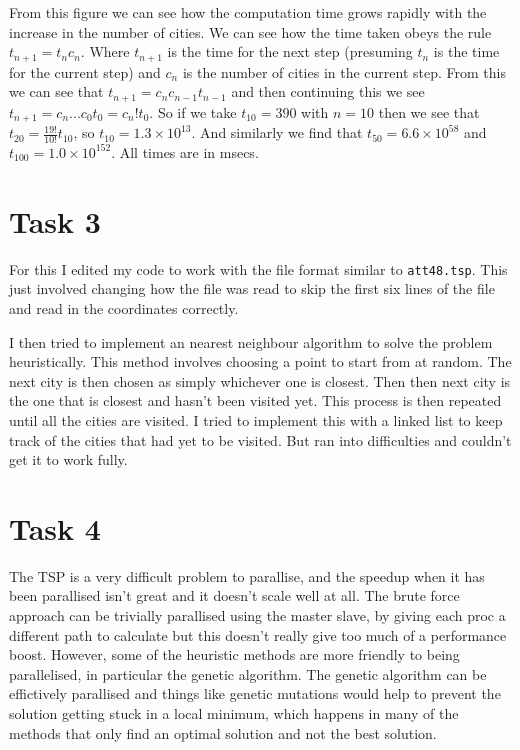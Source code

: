 \documentclass{article}
\begin{document}
From this figure we can see how the computation time grows rapidly with the increase in the number of cities. We can see how the time taken obeys the rule $t_{n+1} = t_n c_n$. Where $t_{n+1}$ is the time for the next step (presuming $t_n$ is the time for the current step) and $c_n$ is the number of cities in the current step. From this we can see that $t_{n+1}=c_n c_{n-1} t_{n-1}$ and then continuing this we see $t_{n+1} = c_n ... c_0 t_0 = c_n ! t_0$. So if we take $t_10 = 390$ with $n=10$ then we see that $t_20 = \frac{19!}{10!}t_{10}$, so $t_{10}=1.3 \times 10^{13}$. And similarly we find that $t_50=6.6 \times 10^{58}$ and $t_100 = 1.0 \times 10^{152}$. All times are in msecs.

\section{Task 3}

For this I edited my code to work with the file format similar to \verb!att48.tsp!. This just involved changing how the file was read to skip the first six lines of the file and read in the coordinates correctly.

I then tried to implement an nearest neighbour algorithm to solve the problem heuristically. This method involves choosing a point to start from at random. The next city is then chosen as simply whichever one is closest. Then then next city is the one that is closest and hasn't been visited yet. This process is then repeated until all the cities are visited. I tried to implement this with a linked list to keep track of the cities that had yet to be visited. But ran into difficulties and couldn't get it to work fully.

\section{Task 4}

The TSP is a very difficult problem to parallise, and the speedup when it has been parallised isn't great and it doesn't scale well at all. The brute force approach can be trivially parallised using the master slave, by giving each proc a different path to calculate but this doesn't really give too much of a performance boost. However, some of the heuristic methods are more friendly to being parallelised, in particular the genetic algorithm. The genetic algorithm can be effictively parallised and things like genetic mutations would help to prevent the solution getting stuck in a local minimum, which happens in many of the methods that only find an optimal solution and not the best solution.
\end{document}
